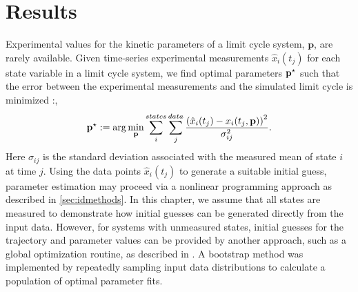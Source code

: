 {\section{Results}

Experimental values for the kinetic parameters of a limit cycle system, $\bm p$, are rarely available. 
Given time-series experimental measurements $\hat{x}_i(t_j)$ for each state variable in a limit cycle system, we find optimal parameters ${\mathbf{p}}^\star$ such that the error between the experimental measurements and the simulated limit cycle is minimized \cite{Bock2007}:,
\begin{equation} \label{eq:cost1}
  {\mathbf{p}}^\star := \arg\min_{\mathbf{p}} \sum_i^{states} \sum_j^{data} \frac{\left(\hat{x}_i(t_j) - x_i(t_j,{\mathbf{p}})\right)^2}{ {\sigma}_{ij}^2}.
\end{equation}
Here ${\sigma}_{ij}$ is the standard deviation associated with the measured mean of state $i$ at time $j$. 
Using the data points $\hat{x}_i(t_j)$ to generate a suitable initial guess, parameter estimation may proceed via a nonlinear programming approach as described in \ref{sec:idmethods}. 
In this chapter, we assume that all states are measured to demonstrate how initial guesses can be generated directly from the input data. 
However, for systems with unmeasured states, initial guesses for the trajectory and parameter values can be provided by another approach, such as a global optimization routine, as described in . 
A bootstrap method was implemented by repeatedly sampling input data distributions to calculate a population of optimal parameter fits.

}
